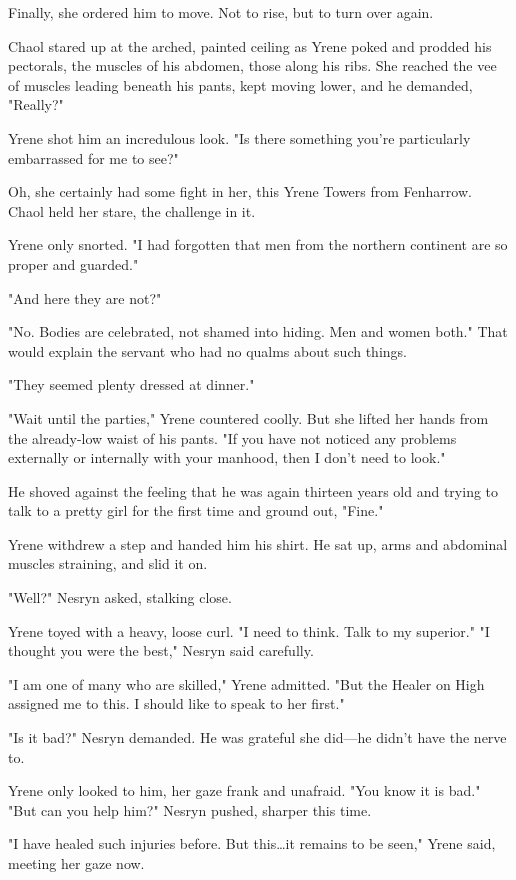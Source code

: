 Finally, she ordered him to move.
Not to rise, but to turn over again.

Chaol stared up at the arched, painted ceiling as Yrene poked and prodded his pectorals, the muscles of his abdomen, those along his ribs.
She reached the vee of muscles leading beneath his pants, kept moving lower, and he demanded, "Really?"

Yrene shot him an incredulous look.
"Is there something you're particularly embarrassed for me to see?"

Oh, she certainly had some fight in her, this Yrene Towers from Fenharrow.
Chaol held her stare, the challenge in it.

Yrene only snorted.
"I had forgotten that men from the northern continent are so proper and guarded."

"And here they are not?"

"No.
Bodies are celebrated, not shamed into hiding.
Men and women both."
That would explain the servant who had no qualms about such things.

"They seemed plenty dressed at dinner."

"Wait until the parties," Yrene countered coolly.
But she lifted her hands from the already-low waist of his pants.
"If you have not noticed any problems externally or internally with your manhood, then I don't need to look."

He shoved against the feeling that he was again thirteen years old and trying to talk to a pretty girl for the first time and ground out, "Fine."

Yrene withdrew a step and handed him his shirt.
He sat up, arms and abdominal muscles straining, and slid it on.

"Well?"
Nesryn asked, stalking close.

Yrene toyed with a heavy, loose curl.
"I need to think.
Talk to my superior."
"I thought you were the best," Nesryn said carefully.

"I am one of many who are skilled," Yrene admitted.
"But the Healer on High assigned me to this.
I should like to speak to her first."

"Is it bad?"
Nesryn demanded.
He was grateful she did---he didn't have the nerve to.

Yrene only looked to him, her gaze frank and unafraid.
"You know it is bad."
"But can you help him?"
Nesryn pushed, sharper this time.

"I have healed such injuries before.
But this\ldots it remains to be seen," Yrene said, meeting her gaze now.

